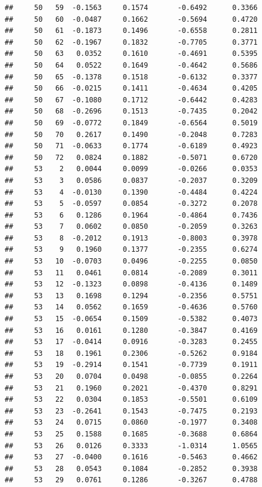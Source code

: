\documentclass[
]{article}
\begin{document}
\begin{verbatim}
##     50   59  -0.1563     0.1574       -0.6492      0.3366  
##     50   60  -0.0487     0.1662       -0.5694      0.4720  
##     50   61  -0.1873     0.1496       -0.6558      0.2811  
##     50   62  -0.1967     0.1832       -0.7705      0.3771  
##     50   63   0.0352     0.1610       -0.4691      0.5395  
##     50   64   0.0522     0.1649       -0.4642      0.5686  
##     50   65  -0.1378     0.1518       -0.6132      0.3377  
##     50   66  -0.0215     0.1411       -0.4634      0.4205  
##     50   67  -0.1080     0.1712       -0.6442      0.4283  
##     50   68  -0.2696     0.1513       -0.7435      0.2042  
##     50   69  -0.0772     0.1849       -0.6564      0.5019  
##     50   70   0.2617     0.1490       -0.2048      0.7283  
##     50   71  -0.0633     0.1774       -0.6189      0.4923  
##     50   72   0.0824     0.1882       -0.5071      0.6720  
##     53    2   0.0044     0.0099       -0.0266      0.0353  
##     53    3   0.0586     0.0837       -0.2037      0.3209  
##     53    4  -0.0130     0.1390       -0.4484      0.4224  
##     53    5  -0.0597     0.0854       -0.3272      0.2078  
##     53    6   0.1286     0.1964       -0.4864      0.7436  
##     53    7   0.0602     0.0850       -0.2059      0.3263  
##     53    8  -0.2012     0.1913       -0.8003      0.3978  
##     53    9   0.1960     0.1377       -0.2355      0.6274  
##     53   10  -0.0703     0.0496       -0.2255      0.0850  
##     53   11   0.0461     0.0814       -0.2089      0.3011  
##     53   12  -0.1323     0.0898       -0.4136      0.1489  
##     53   13   0.1698     0.1294       -0.2356      0.5751  
##     53   14   0.0562     0.1659       -0.4636      0.5760  
##     53   15  -0.0654     0.1509       -0.5382      0.4073  
##     53   16   0.0161     0.1280       -0.3847      0.4169  
##     53   17  -0.0414     0.0916       -0.3283      0.2455  
##     53   18   0.1961     0.2306       -0.5262      0.9184  
##     53   19  -0.2914     0.1541       -0.7739      0.1911  
##     53   20   0.0704     0.0498       -0.0855      0.2264  
##     53   21   0.1960     0.2021       -0.4370      0.8291  
##     53   22   0.0304     0.1853       -0.5501      0.6109  
##     53   23  -0.2641     0.1543       -0.7475      0.2193  
##     53   24   0.0715     0.0860       -0.1977      0.3408  
##     53   25   0.1588     0.1685       -0.3688      0.6864  
##     53   26   0.0126     0.3333       -1.0314      1.0565  
##     53   27  -0.0400     0.1616       -0.5463      0.4662  
##     53   28   0.0543     0.1084       -0.2852      0.3938  
##     53   29   0.0761     0.1286       -0.3267      0.4788  

\end{verbatim}
\end{document}
